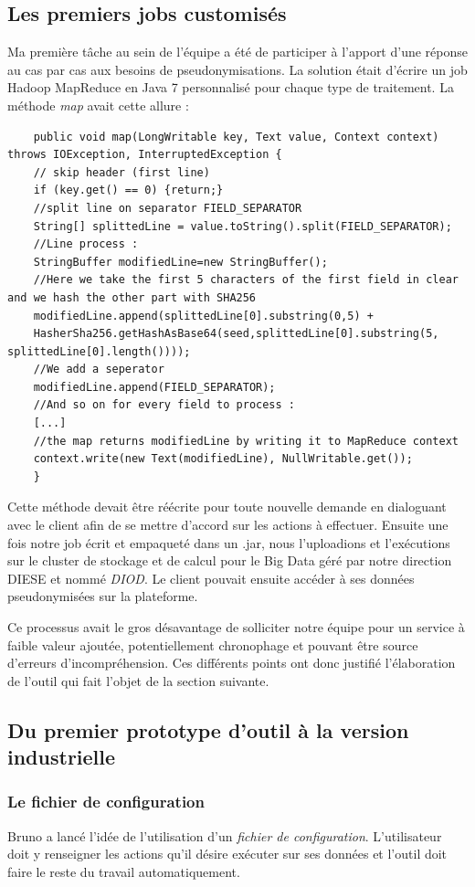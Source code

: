 \documentclass[12pt]{report}
\begin{document}
	\subsection{Les premiers jobs customisés}
	Ma première tâche au sein de l'équipe a été de participer à l'apport d'une réponse au cas par cas aux besoins de pseudonymisations. La solution était d'écrire un job Hadoop MapReduce en Java 7 personnalisé pour chaque type de traitement. La méthode \textit{map} avait cette allure :
	\begin{lstlisting}
	public void map(LongWritable key, Text value, Context context) throws IOException, InterruptedException {
	// skip header (first line)
	if (key.get() == 0) {return;}
	//split line on separator FIELD_SEPARATOR
	String[] splittedLine = value.toString().split(FIELD_SEPARATOR);
	//Line process :
	StringBuffer modifiedLine=new StringBuffer();
	//Here we take the first 5 characters of the first field in clear and we hash the other part with SHA256
	modifiedLine.append(splittedLine[0].substring(0,5) + 
	HasherSha256.getHashAsBase64(seed,splittedLine[0].substring(5, splittedLine[0].length())));
	//We add a seperator
	modifiedLine.append(FIELD_SEPARATOR);
	//And so on for every field to process :
	[...]
	//the map returns modifiedLine by writing it to MapReduce context
	context.write(new Text(modifiedLine), NullWritable.get());
	}
	\end{lstlisting}
	Cette méthode devait être réécrite pour toute nouvelle demande en dialoguant avec le client afin de se mettre d'accord sur les actions à effectuer. Ensuite une fois notre job écrit et empaqueté dans un .jar, nous l'uploadions et l'exécutions sur le cluster de stockage et de calcul pour le Big Data géré par notre direction DIESE et nommé \textit{DIOD}. Le client pouvait ensuite accéder à ses données pseudonymisées sur la plateforme.
	
	Ce processus avait le gros désavantage de solliciter notre équipe pour un service à faible valeur ajoutée, potentiellement chronophage et pouvant être source d'erreurs d'incompréhension. Ces différents points ont donc justifié l'élaboration de l'outil qui fait l'objet de la section suivante.
	
	\subsection{Du premier prototype d'outil à la version industrielle} 
	\subsubsection{Le fichier de configuration}
	Bruno a lancé l'idée de l'utilisation d'un \textit{fichier de configuration}. L'utilisateur doit y renseigner les actions qu'il désire exécuter sur ses données et l'outil doit faire le reste du travail automatiquement.
	
\end{document}
